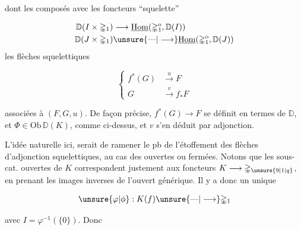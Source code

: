 dont les composés avec les foncteurs ``squelette''

\[
\begin{aligned}
\mathbb D(I\times\mathbb{\Delta}_1)&\longrightarrow\underline{\operatorname{Hom}}(\mathbb{\Delta}_1^{\mathrm o},\mathbb D(I))\\
\mathbb D(J\times\mathbb{\Delta}_1)&\unsure{\text{---}|\longrightarrow}\underline{\operatorname{Hom}}(\mathbb{\Delta}_1^{\mathrm o},\mathbb D(J))
\end{aligned}
\]
  les flèches squelettiques

\[
\left\{\begin{aligned}
f^*(G)&\xrightarrow{u}F\\
G&\xrightarrow{v}f_*F
\end{aligned}\right.
\]

associées à $(F,G,u)$. De façon précise, $f^*(G)\longrightarrow F$  se définit en termes de $\mathbb D$, et $\Phi\in\mathrm{Ob}\,\mathbb D(K)$, comme ci-dessus, et $v$ s'en déduit par adjonction.

L'idée naturelle ici, serait de ramener le pb de l'étoffement des flèches d'adjonction squelettiques, au cas des  ouvertes ou fermées. Notons que les sous-cat. ouvertes de $K$ correspondent justement aux foncteurs $K\longrightarrow\mathbb{\Delta}_{\unsure{9|1|q}}$, en prenant les images inverses de l'ouvert générique. Il y a donc un unique

\[
\unsure{\varphi|\phi}:K(f)\unsure{\text{---}|\longrightarrow}\mathbb{\Delta}_1
\]

avec $I=\varphi^{-1}(\{0\})$. Donc
